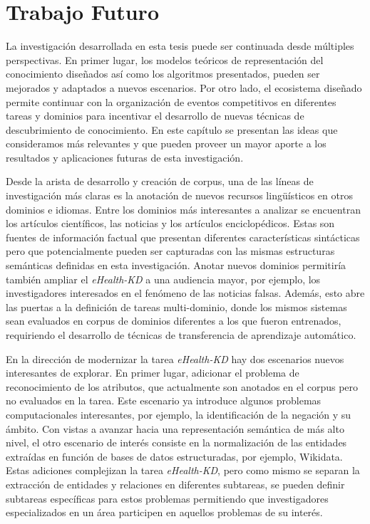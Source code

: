 \chapter{Trabajo Futuro}\label{Chap:FutureWork}

La investigación desarrollada en esta tesis puede ser continuada desde múltiples perspectivas.
En primer lugar, los modelos teóricos de representación del conocimiento diseñados así como los algoritmos presentados, pueden ser mejorados y adaptados a nuevos escenarios.
Por otro lado, el ecosistema diseñado permite continuar con la organización de eventos competitivos en diferentes tareas y dominios para incentivar el desarrollo de nuevas técnicas de descubrimiento de conocimiento.
En este capítulo se presentan las ideas que consideramos más relevantes y que pueden proveer un mayor aporte a los resultados y aplicaciones futuras de esta investigación.

Desde la arista de desarrollo y creación de corpus, una de las líneas de investigación más claras es la anotación de nuevos recursos lingüísticos en otros dominios e idiomas. 
Entre los dominios más interesantes a analizar se encuentran los artículos científicos, las noticias y los artículos enciclopédicos. Estas son fuentes de información factual que presentan diferentes características sintácticas pero que potencialmente pueden ser capturadas con las mismas estructuras semánticas definidas en esta investigación.
Anotar nuevos dominios permitiría también ampliar el \textit{eHealth-KD} a una audiencia mayor, por ejemplo, los investigadores interesados en el fenómeno de las noticias falsas.
Además, esto abre las puertas a la definición de tareas multi-dominio, donde los mismos sistemas sean evaluados en corpus de dominios diferentes a los que fueron entrenados, requiriendo el desarrollo de técnicas de transferencia de aprendizaje automático.

En la dirección de modernizar la tarea \textit{eHealth-KD} hay dos escenarios nuevos interesantes de explorar.
En primer lugar, adicionar el problema de reconocimiento de los atributos, que actualmente son anotados en el corpus pero no evaluados en la tarea. Este escenario ya introduce algunos problemas computacionales interesantes, por ejemplo, la identificación de la negación y su ámbito.
Con vistas a avanzar hacia una representación semántica de más alto nivel, el otro escenario de interés consiste en la normalización de las entidades extraídas en función de bases de datos estructuradas, por ejemplo, Wikidata.
Estas adiciones complejizan la tarea \textit{eHealth-KD}, pero como mismo se separan la extracción de entidades y relaciones en diferentes subtareas, se pueden definir subtareas específicas para estos problemas permitiendo que investigadores especializados en un área participen en aquellos problemas de su interés.

